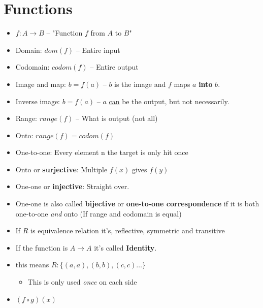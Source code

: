 \documentclass[english,10pt,a4paper]{article}
\begin{document}
\newpage
\section{Functions}

\begin{theo}[Basic] 
\begin{itemize}
\item $f: A \rightarrow B$ -- "Function $f$ from $A$ to $B$"
\item Domain: $dom(f)$ -- Entire input
\item Codomain: $codom(f)$ -- Entire output
\item Image and map: $b=f(a)$ -- $b$ is the image and $f$ maps $a$ \textbf{into} $b$.
\item Inverse image: $b=f(a)$ -- $a$ \underline{can} be the output, but not necessarily.
\item Range: $range(f)$ -- What is output (not all)
\item Onto: $range(f) = codom(f)$
\item One-to-one: Every element n the target is only hit once
\end{itemize}
\end{theo}


\begin{theo} 
\begin{itemize}
\item Onto or \textbf{surjective}: Multiple $f(x)$ gives $f(y)$
\item One-one or \textbf{injective}: Straight over.
\item One-one is also called \textbf{bijective} or \textbf{one-to-one correspondence} if it is both one-to-one \textit{and} onto (If range and codomain is equal)
\end{itemize}
\end{theo}


\begin{theo} 
\begin{itemize}
\item If $R$ is equivalence relation it's,  reflective, symmetric and transitive
\item If the function is $A \rightarrow A$ it's called \textbf{Identity}.
\item this means $R: \{ (a,a),(b,b), (c,c)\ldots\}$
\begin{itemize}
\item This is only used \textit{once} on each side
\end{itemize}
\end{itemize}
\end{theo}


\begin{theo}[Composition] 
\begin{itemize}
\item $(f \circ g)(x)$
\end{itemize}
\end{theo}
\end{document}
